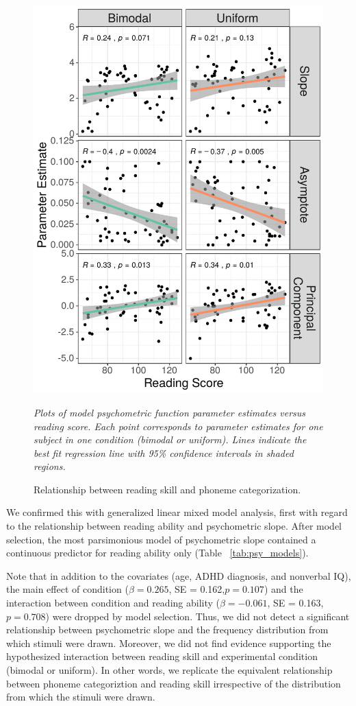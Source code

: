\documentclass[../uwthesis.tex]{subfiles}
\begin{document}
 
 \begin{figure}
    \centering
    \caption{Relationship between reading skill and phoneme categorization.}
    \label{fig:reading_par}
    \includegraphics[width = 10 cm]{images/paper_4/parameter_relationships.pdf}
    \item \textit{Plots of model psychometric function parameter estimates versus reading score. Each point corresponds to parameter estimates for one subject in one condition (bimodal or uniform). Lines indicate the best fit regression line with 95\% confidence intervals in shaded regions.}
\end{figure}
 
We confirmed this with generalized linear mixed model analysis, first with regard to the relationship between reading ability and psychometric slope. After model selection, the most parsimonious model of psychometric slope contained a continuous predictor for reading ability only (Table ~\ref{tab:psy_models}).
 
Note that in addition to the covariates (age, ADHD diagnosis, and nonverbal IQ), the main effect  of condition ($\beta = 0.265$, SE = 0.162,$p=0.107$) and the interaction between condition and reading ability ($\beta = -0.061$, SE = 0.163,$p=0.708$) were dropped by model selection. Thus, we did not detect a significant relationship between psychometric slope and the frequency distribution from which stimuli were drawn. Moreover, we did not find evidence supporting the hypothesized interaction between reading skill and experimental condition (bimodal or uniform). In other words, we replicate the equivalent relationship between phoneme categoriztion and reading skill irrespective of the distribution from which the stimuli were drawn.
 
\end{document}
